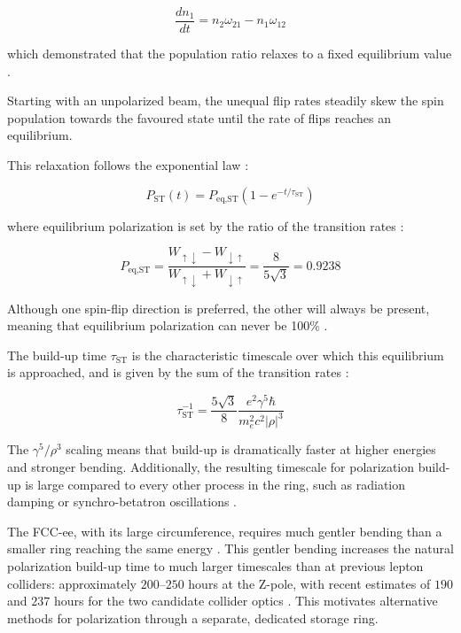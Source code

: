 \documentclass[%
 aip,
 amsmath,amssymb,
 reprint,%
superscriptaddress
]{revtex4-2}
\begin{document}
\begin{equation}
\frac{dn_1}{dt}=n_2 \omega_{21} - n_1 \omega_{12}
\end{equation}


which demonstrated that the population ratio relaxes to a fixed equilibrium value \cite{sokolov_ternov_1963}.

Starting with an unpolarized beam, the unequal flip rates steadily skew the spin population towards the favoured state until the rate of flips reaches an equilibrium.\cite{sokolov_ternov_1963, assmann_1999}

This relaxation follows the exponential law \cite{derbenev_kondratenko_1973}:



\begin{equation}
P_{\text{ST}}(t)=P_{\text{eq,ST}}(1-e^{-t/\tau_{\text{ST}}})
\end{equation}

where equilibrium polarization is set by the ratio of the transition rates \cite{Buon269521, sokolov_ternov_1963}:

\begin{equation}
P_{\text{eq,ST}}=\frac{W_{\uparrow\downarrow}  - W_{\downarrow\uparrow} }{W_{\uparrow\downarrow}  +W_{\downarrow\uparrow} } =\frac{8}{5\sqrt{3}}=0.9238
\end{equation}



Although one spin-flip direction is preferred, the other will always be present, meaning that equilibrium polarization can never be 100\% \cite{Buon269521}.

The build-up time $\tau_{\text{ST}}$ is the characteristic timescale over which this equilibrium is approached, and is given by the sum of the transition rates \cite{Buon269521, sokolov_ternov_1963}:


\begin{equation}
\tau_{\text{ST}}^{-1}= \frac{5\sqrt{3}}{8} \frac{e^2 \gamma^5 \hbar}{m_e^2 c^2 |\rho|^3}
\end{equation}


The $\gamma^5/\rho^3$ scaling means that build-up is dramatically faster at higher energies and stronger bending. Additionally, the resulting timescale for polarization build-up is large compared to every other process in the ring, such as radiation damping or synchro-betatron oscillations \cite{zara_berglund_2001}.

The FCC-ee, with its large circumference, requires much gentler bending than a smaller ring reaching the same energy \cite{suleiman_2023}. This gentler bending increases the natural polarization build-up time to much larger timescales than at previous lepton colliders: approximately $200$–$250$ hours at the Z-pole, with recent estimates of $190$ and $237$ hours for the two candidate collider optics \cite{blondel_polarization_2019,keintzel:ipac2026-mop1037}. This motivates alternative methods for polarization through a separate, dedicated storage ring.
\end{document}

